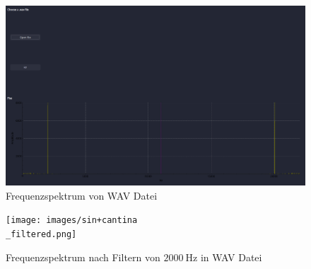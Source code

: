 \begin{frame}{\insertsection}
	\begin{figure}
		\includegraphics[width=\linewidth]{images/sin+cantina.png}
		\caption*{Frequenzspektrum von WAV Datei}
	\end{figure}
\end{frame}
\begin{frame}{\insertsection}
	\begin{figure}
		\texttt{[image: images/sin+cantina\\\_filtered.png]}
		\caption*{Frequenzspektrum nach Filtern von $\SI{2000}{\hertz}$ in WAV Datei}
	\end{figure}
\end{frame}
